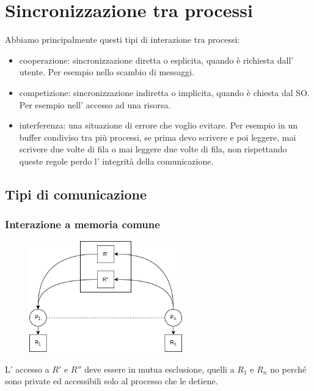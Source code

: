 \section{Sincronizzazione tra processi}
Abbiamo principalmente questi tipi di interazione tra processi:
\begin{itemize}
    \item cooperazione: sincronizzazione diretta o esplicita, quando è richiesta dall' utente.
    Per esempio nello scambio di messaggi.

    \item competizione: sincronizzazione indiretta o implicita, quando è chiesta dal SO.
    Per esempio nell' accesso ad una risorsa.
    
    \item interferenza: una situazione di errore che voglio evitare.
    Per esempio in un buffer condiviso tra più processi, se prima devo scrivere e poi leggere, mai scrivere due volte di fila o mai leggere due volte di fila, non rispettando queste regole perdo l' integrità della comunicazione.
\end{itemize}

\subsection{Tipi di comunicazione}
\subsubsection{Interazione a memoria comune}
\begin{figure}[H]
    \centering
    \includegraphics[width=250px]{images/6_Sincronizzazione_tra_processi/memoria_comune.png}
\end{figure}
L' accesso a $R'$ e $R''$ deve essere in mutua esclusione, quelli a $R_1$ e $R_n$ no perché sono private ed accessibili solo al processo che le detiene.

